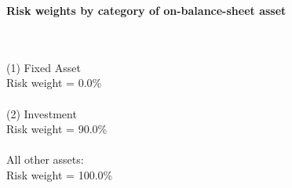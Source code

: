 \documentclass{article}
\begin{document}
\setlength{\parindent}{0em}
\begin{center}{\bf Risk weights by category of on-balance-sheet asset}\end{center}
~\\
~\\

(1) Fixed Asset\\
Risk weight = 0.0\%\\

~\\
(2) Investment\\
Risk weight = 90.0\%\\

~\\
All other assets:\\
Risk weight = 100.0\%\\

~\\
\end{document}
